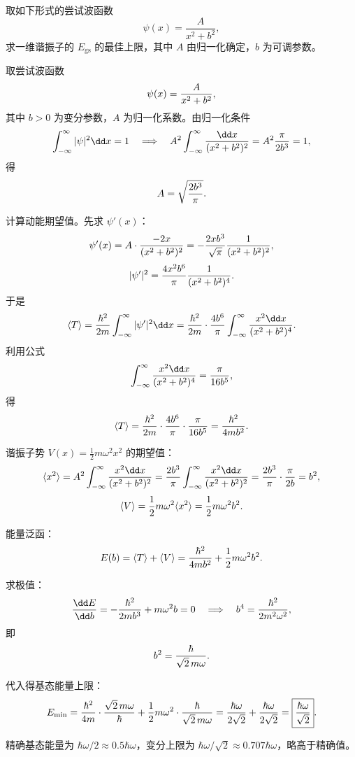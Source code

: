 \begin{question}
取如下形式的尝试波函数
\[
\psi(x)=\frac{A}{x^2+b^2},
\]
求一维谐振子的 $E_{\mathrm{gs}}$ 的最佳上限，其中 $A$ 由归一化确定，$b$ 为可调参数。
\end{question}
\begin{solution}
取尝试波函数
\[
\psi(x)={A\over x^2+b^2},
\]
其中 $b>0$ 为变分参数，$A$ 为归一化系数。由归一化条件
\[
\int_{-\infty}^{\infty}|\psi|^2\dd x=1
\quad\Longrightarrow\quad
A^2\int_{-\infty}^{\infty}{\dd x\over(x^2+b^2)^2}=A^2{\pi\over2b^3}=1,
\]
得
\[
A=\sqrt{2b^3\over\pi}.
\]

计算动能期望值。先求 $\psi'(x)$：
\[
\psi'(x)=A\cdot{-2x\over(x^2+b^2)^2}
=-{2xb^3\over\sqrt{\pi}}{1\over(x^2+b^2)^2},
\]
\[
|\psi'|^2={4x^2b^6\over\pi}{1\over(x^2+b^2)^4}.
\]
于是
\[
\langle T\rangle={\hbar^2\over2m}\int_{-\infty}^{\infty}|\psi'|^2\dd x
={\hbar^2\over2m}\cdot{4b^6\over\pi}\int_{-\infty}^{\infty}{x^2\dd x\over(x^2+b^2)^4}.
\]
利用公式
\[
\int_{-\infty}^{\infty}{x^2\dd x\over(x^2+b^2)^4}={\pi\over16b^5},
\]
得
\[
\langle T\rangle={\hbar^2\over2m}\cdot{4b^6\over\pi}\cdot{\pi\over16b^5}
={\hbar^2\over4mb^2}.
\]

谐振子势 $V(x)=\frac12m\omega^2x^2$ 的期望值：
\[
\langle x^2\rangle = A^2\int_{-\infty}^{\infty}{x^2\dd x\over(x^2+b^2)^2}
={2b^3\over\pi}\int_{-\infty}^{\infty}{x^2\dd x\over(x^2+b^2)^2}
={2b^3\over\pi}\cdot{\pi\over2b}=b^2,
\]
\[
\langle V\rangle={1\over2}m\omega^2\langle x^2\rangle={1\over2}m\omega^2b^2.
\]

能量泛函：
\[
E(b)=\langle T\rangle+\langle V\rangle
={\hbar^2\over4mb^2}+{1\over2}m\omega^2b^2.
\]

求极值：
\[
{\dd E\over\dd b}=-{\hbar^2\over2mb^3}+m\omega^2b=0
\quad\Longrightarrow\quad
b^4={\hbar^2\over2m^2\omega^2},
\]
即
\[
b^2={\hbar\over\sqrt2\,m\omega}.
\]

代入得基态能量上限：
\[
E_{\min}={\hbar^2\over4m}\cdot{\sqrt2\,m\omega\over\hbar}
+{1\over2}m\omega^2\cdot{\hbar\over\sqrt2\,m\omega}
={\hbar\omega\over2\sqrt2}+{\hbar\omega\over2\sqrt2}
=\boxed{{\hbar\omega\over\sqrt2}}.
\]

精确基态能量为 $\hbar\omega/2\approx0.5\hbar\omega$，变分上限为 $\hbar\omega/\sqrt2\approx0.707\hbar\omega$，略高于精确值。
\end{solution}

